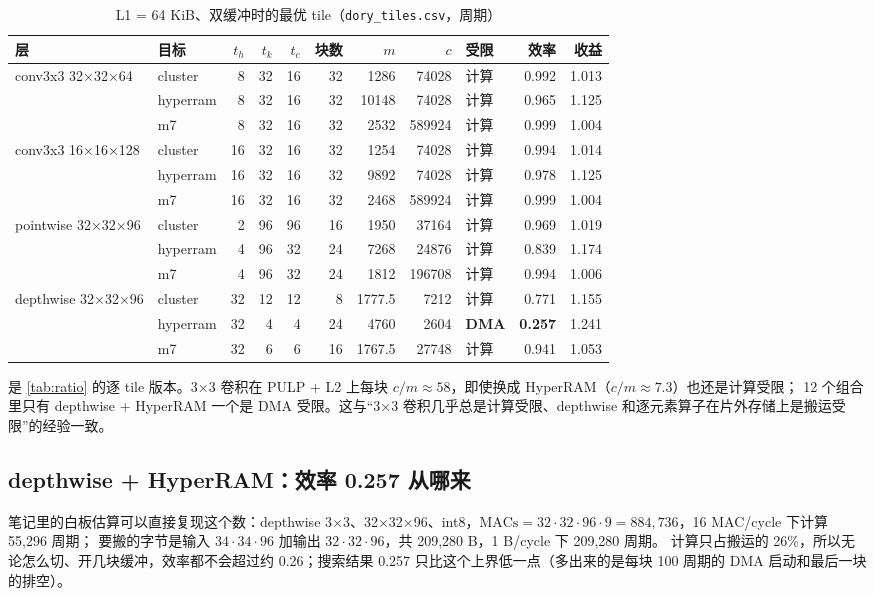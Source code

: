 \documentclass[11pt,a4paper]{ctexart}
\begin{document}
\begin{table}[H]
\centering\small
\caption{L1 = 64 KiB、双缓冲时的最优 tile（\texttt{dory\_tiles.csv}，周期）}\label{tab:tiles64}
\begin{tabular}{llrrrrrrlrr}
\toprule
层 & 目标 & $t_h$ & $t_k$ & $t_c$ & 块数 & $m$ & $c$ & 受限 & 效率 & 收益 \\
\midrule
conv3x3 32×32×64 & cluster & 8 & 32 & 16 & 32 & 1286 & 74028 & 计算 & 0.992 & 1.013 \\
 & hyperram & 8 & 32 & 16 & 32 & 10148 & 74028 & 计算 & 0.965 & 1.125 \\
 & m7 & 8 & 32 & 16 & 32 & 2532 & 589924 & 计算 & 0.999 & 1.004 \\
\midrule
conv3x3 16×16×128 & cluster & 16 & 32 & 16 & 32 & 1254 & 74028 & 计算 & 0.994 & 1.014 \\
 & hyperram & 16 & 32 & 16 & 32 & 9892 & 74028 & 计算 & 0.978 & 1.125 \\
 & m7 & 16 & 32 & 16 & 32 & 2468 & 589924 & 计算 & 0.999 & 1.004 \\
\midrule
pointwise 32×32×96 & cluster & 2 & 96 & 96 & 16 & 1950 & 37164 & 计算 & 0.969 & 1.019 \\
 & hyperram & 4 & 96 & 32 & 24 & 7268 & 24876 & 计算 & 0.839 & 1.174 \\
 & m7 & 4 & 96 & 32 & 24 & 1812 & 196708 & 计算 & 0.994 & 1.006 \\
\midrule
depthwise 32×32×96 & cluster & 32 & 12 & 12 & 8 & 1777.5 & 7212 & 计算 & 0.771 & 1.155 \\
 & hyperram & 32 & 4 & 4 & 24 & 4760 & 2604 & \textbf{DMA} & \textbf{0.257} & 1.241 \\
 & m7 & 32 & 6 & 6 & 16 & 1767.5 & 27748 & 计算 & 0.941 & 1.053 \\
\bottomrule
\end{tabular}
\end{table}

 是 \cref{tab:ratio} 的逐 tile 版本。3×3 卷积在 PULP + L2 上每块 $c/m\approx58$，即使换成 HyperRAM（$c/m\approx7.3$）也还是计算受限；
12 个组合里只有 depthwise + HyperRAM 一个是 DMA 受限。这与“3×3 卷积几乎总是计算受限、depthwise 和逐元素算子在片外存储上是搬运受限”的经验一致。

\subsection{depthwise + HyperRAM：效率 0.257 从哪来}

笔记里的白板估算可以直接复现这个数：depthwise 3×3、32×32×96、int8，$\text{MACs}=32\cdot32\cdot96\cdot9=884{,}736$，16 MAC/cycle 下计算 55,296 周期；
要搬的字节是输入 $34\cdot34\cdot96$ 加输出 $32\cdot32\cdot96$，共 209,280 B，1 B/cycle 下 209,280 周期。
计算只占搬运的 26\%，所以无论怎么切、开几块缓冲，效率都不会超过约 0.26；搜索结果 0.257 只比这个上界低一点（多出来的是每块 100 周期的 DMA 启动和最后一块的排空）。
\end{document}
